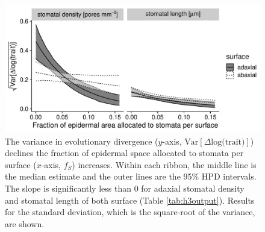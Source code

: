 \documentclass[
  12pt,
]{article}
\begin{document}
\begin{figure}[ht]
  \captionsetup{labelformat=empty}
  \caption{}
  \label{fig:h2_raw}
\end{figure}

\begin{figure}[ht]
  \captionsetup{labelformat=empty}
  \caption{}
  \label{fig:h2}
\end{figure}

\renewcommand\thefigure{S\arabic{figure}}    
\renewcommand\thetable{S\arabic{table}}    
\renewcommand\theequation{S\arabic{equation}}    
\setcounter{figure}{0}    
\setcounter{table}{0}    
\setcounter{equation}{0}

\begin{figure}[ht]
\includegraphics[width=\textwidth]{../figures/fs-sigma.pdf}
\caption{The variance in evolutionary divergence ($y$-axis, $\textrm{Var}[\Delta \textrm{log(trait)}]$) declines the fraction of epidermal space allocated to stomata per surface ($x$-axis, $f_S$) increases. Within each ribbon, the middle line is the median estimate and the outer lines are the 95\% HPD intervals. The slope is significantly less than 0 for adaxial stomatal density and stomatal length of both surface (Table \ref{tab:h3output}). Results for the standard deviation, which is the square-root of the variance, are shown.}
\label{fig:fs-sigma}
\end{figure}
\end{document}
